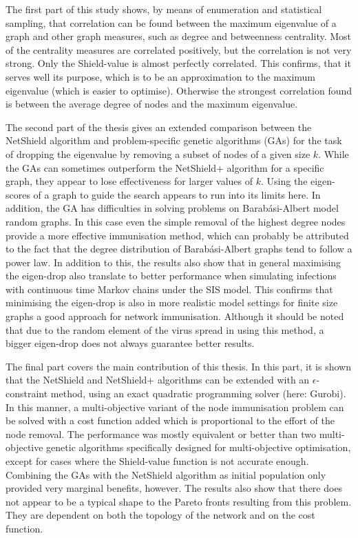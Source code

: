 \documentclass[11pt]{article}
\theoremstyle{definition}
\begin{document}
The first part of this study shows, by means of enumeration and statistical sampling, that correlation can be found between the maximum eigenvalue of a graph and other graph measures, such as degree and betweenness centrality. Most of the centrality measures are correlated positively, but the correlation is not very strong. Only the Shield-value is almost perfectly correlated. This confirms, that it serves well its purpose, which is to be an approximation to the maximum eigenvalue (which is easier to optimise). Otherwise the strongest correlation found is between the average degree of nodes and the maximum eigenvalue.

The second part of the thesis gives an extended comparison between the NetShield algorithm and problem-specific genetic algorithms (GAs) for the task of dropping the eigenvalue by removing a subset of nodes of a given size $k$. While the GAs can sometimes outperform the NetShield+ algorithm for a specific graph, they appear to lose effectiveness for larger values of $k$. Using the eigen-scores of a graph to guide the search appears to run into its limits here. In addition, the GA has difficulties in solving problems on Barab\'asi-Albert model random graphs. In this case even the simple removal of the highest degree nodes provide a more effective immunisation method, which can probably be attributed to the fact that the degree distribution of Barab\'asi-Albert graphs tend to follow a power law. In addition to this, the results also show that in general maximising the eigen-drop also translate to better performance when simulating infections with continuous time Markov chains under the SIS model. This confirms that minimising the eigen-drop is also in more realistic model settings for finite size graphs a good approach for network immunisation. Although it should be noted that due to the random element of the virus spread in using this method, a bigger eigen-drop does not always guarantee better results.

The final part covers the main contribution of this thesis. In this part, it is shown that the NetShield and NetShield+ algorithms can be extended with an $\epsilon$-constraint method, using an exact quadratic programming solver (here: Gurobi). In this manner, a multi-objective variant of the node immunisation problem can be solved with a cost function added which is proportional to the effort of the node removal. The performance was mostly equivalent or better than two multi-objective genetic algorithms specifically designed for multi-objective optimisation, except for cases where the Shield-value function is not accurate enough. Combining the GAs with the NetShield algorithm as initial population only provided very marginal benefits, however. The results also show that there does not appear to be a typical shape to the Pareto fronts resulting from this problem. They are dependent on both the topology of the network and on the cost function.
\end{document}
